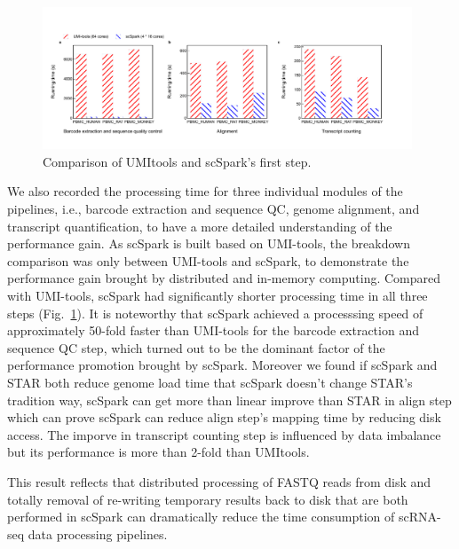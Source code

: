 \documentclass[conference]{IEEEtran}
\begin{document}
\begin{figure}
	\centering
	\includegraphics[width=0.98\textwidth]{fig2.pdf}
	\caption{Comparison of UMI\-tools and scSpark's first step.} \label{fig2}
\end{figure}
We also recorded the processing time for three individual modules of the pipelines, i.e., barcode extraction and sequence QC, genome alignment, and transcript quantification, to have a more detailed understanding of the performance gain. 
As scSpark is built based on UMI-tools, the breakdown comparison was only between UMI-tools and scSpark, to demonstrate the performance gain brought by distributed and in-memory computing.
Compared with UMI-tools, scSpark had significantly shorter processing time in all three steps (Fig.~\ref{fig2}).
It is noteworthy that scSpark achieved a processsing speed of approximately 50-fold faster than UMI-tools for the barcode extraction and sequence QC step, which turned out to be the dominant factor of the performance promotion brought by scSpark.
Moreover we found if scSpark and STAR both reduce genome load time that scSpark doesn't change STAR's tradition way, scSpark can get more than linear improve than STAR in align step which can prove scSpark can reduce align step's mapping time by reducing disk access.
The imporve in transcript counting step is influenced by data imbalance but its performance is more than 2-fold than UMI\-tools.

This result reflects that distributed processing of FASTQ reads from disk and totally removal of re-writing temporary results back to disk that are both performed in scSpark can dramatically reduce the time consumption of scRNA-seq data processing pipelines. 
\end{document}

